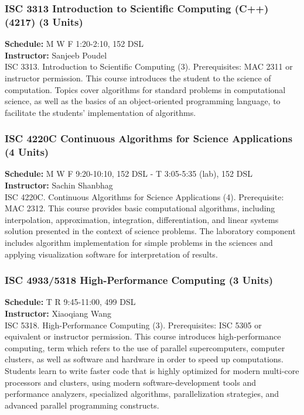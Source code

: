 \documentclass[12pt,a4paper]{article}
\begin{document}
\subsubsection*{ISC 3313 Introduction to Scientific Computing (C++) (4217) (3 Units)}
\textbf{Schedule:} M W F 1:20-2:10, 152 DSL \\
\textbf{Instructor:} Sanjeeb Poudel \\
ISC 3313. Introduction to Scientific Computing (3). Prerequisites: MAC 2311 or instructor permission. This course introduces the student to the science of computation. Topics cover algorithms for standard problems in computational science, as well as the basics of an object-oriented programming language, to facilitate the students' implementation of algorithms.

\subsubsection*{ISC 4220C Continuous Algorithms for Science Applications (4 Units)}
\textbf{Schedule:} M W F 9:20-10:10, 152 DSL - T 3:05-5:35 (lab), 152 DSL \\
\textbf{Instructor:} Sachin Shanbhag \\
ISC 4220C. Continuous Algorithms for Science Applications (4). Prerequisite: MAC 2312. This course provides basic computational algorithms, including interpolation, approximation, integration, differentiation, and linear systems solution presented in the context of science problems. The laboratory component includes algorithm implementation for simple problems in the sciences and applying visualization software for interpretation of results.

\subsubsection*{ISC 4933/5318 High-Performance Computing (3 Units)}
\textbf{Schedule:} T R 9:45-11:00, 499 DSL \\
\textbf{Instructor:} Xiaoqiang Wang \\
ISC 5318. High-Performance Computing (3). Prerequisites: ISC 5305 or equivalent or instructor permission. This course introduces high-performance computing, term which refers to the use of parallel supercomputers, computer clusters, as well as software and hardware in order to speed up computations. Students learn to write faster code that is highly optimized for modern multi-core processors and clusters, using modern software-development tools and performance analyzers, specialized algorithms, parallelization strategies, and advanced parallel programming constructs.
\end{document}

